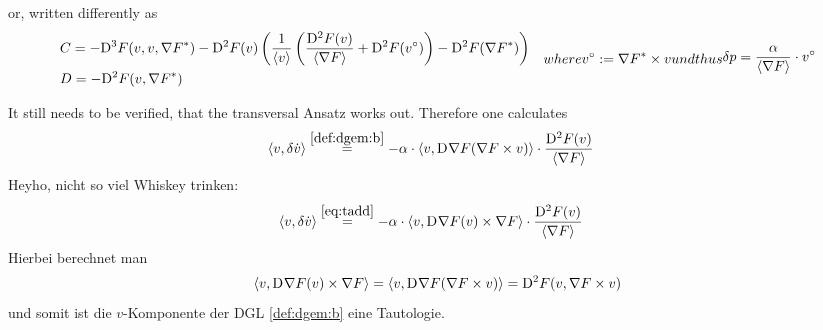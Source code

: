 or, written differently as
\begin{subequations}
    \begin{align}
        &\begin{aligned}
            C   &=
            - \diff{3}{F}( v, v, \darg{F} )  -
            \diff{2}{F}( v )
            \left( \frac{ 1 }{ \skaq{v} }
            \left( \frac{ \diff{2}{F}( v ) }{ \skaq{\grad{F}} }  +
            \diff{2}{F}( v^\circ ) \right)  -
            \diff{2}{F}( \darg{F} ) \right)
        \end{aligned}\\
        &D   =   - \diff{2}{F}( v, \darg{F} )
    \end{align}
    where
    \begin{align}
        v^\circ   :=
        \darg{F} \times v
    \end{align}
    und thus
    \begin{align}
        \delta p   =
        \frac{ \alpha }{ \skaq{\grad{F}} } \mult v^\circ
    \end{align}
\end{subequations}



It still needs to be verified, that the transversal Ansatz works out.
Therefore one calculates
\begin{align}
    \langle  v ,  \delta \dot{ v }  \rangle  &\overset{\eqref{def:dgem:b}}{=}
    -\alpha \cdot \langle  v ,  \mathrm{D}^{  }\nabla F( \nabla F \times v )  \rangle \cdot \frac{ \mathrm{D}^{ 2 }F( v ) }{ \langle  \nabla F  \rangle }
\end{align}
Heyho, nicht so viel Whiskey trinken:
\begin{align}
    \langle  v ,  \delta \dot{ v }  \rangle  &\overset{\eqref{eq:tadd}}{=}
    -\alpha \cdot \langle  v ,  \mathrm{D}^{  }\nabla F( v ) \times \nabla F  \rangle  \cdot
    \frac{ \mathrm{D}^{ 2 }F( v ) }{ \langle  \nabla F   \rangle }
\end{align}
Hierbei berechnet man
\begin{align}
    \langle  v ,  \mathrm{D}^{  }\nabla F( v ) \times \nabla F  \rangle  =
    \langle  v ,  \mathrm{D}^{  }\nabla F( \nabla F \times v )  \rangle  =
    \mathrm{D}^{ 2 }F( v, \nabla F \times v )
\end{align}
und somit ist die $ v $-Komponente der DGL \eqref{def:dgem:b} eine Tautologie.